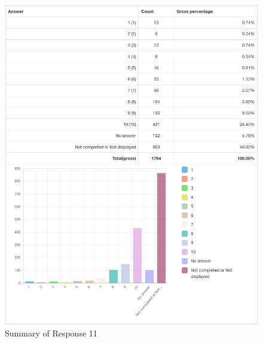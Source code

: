 \documentclass{article}
\begin{document}
\vspace{3mm}
\begin{figure}[h!]
\centering
\includegraphics[width=16.3cm]{assets/11-summary.png}
\caption{Summary of Response 11}
\end{figure}
\end{document}
